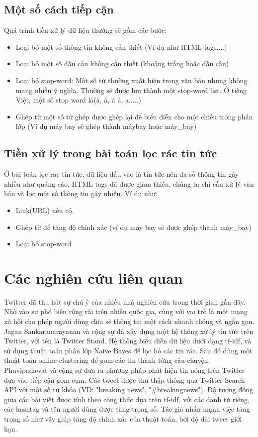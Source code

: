 \subsection{Một số cách tiếp cận}
Quá trình tiền xử lý dữ liệu thường sẽ gồm các bước:
\begin{itemize}
	\item Loại bỏ một số thông tin không cần thiết (Ví dụ như HTML tags,...)
	\item Loại bỏ một số dấu câu không cần thiết (khoảng trắng hoặc dấu câu)
	\item Loại bỏ stop-word: Một số từ thường xuất hiện trong văn bản nhưng không mang nhiều ý nghĩa. Thường sẽ được lưu thành một stop-word list. Ở tiếng Việt, một số stop word là(à, á, á à, ạ,....)
	\item Ghép từ một số từ ghép được ghép lại để biểu diễn cho một chiều trong phân lớp (Ví dụ máy bay sẽ ghép thành máybay hoặc máy\_bay)
\end{itemize}
\subsection{Tiền xử lý trong bài toán lọc rác tin tức}
Ở bài toán lọc rác tin tức, dữ liệu đầu vào là tin tức nên đa số thông tin gây nhiễu như quảng cáo, HTML tags đã được giảm thiểu, chúng ta chỉ cần xử lý văn bản và lọc một số thông tin gây nhiễu. Ví dụ như:
\begin{itemize}
	\item Link(URL) nếu có.
	\item Ghép từ để tăng độ chính xác (ví dụ máy bay sẽ được ghép thành máy\_bay)
	\item Loại bỏ stop-word
\end{itemize} 
\section{Các nghiên cứu liên quan}
Twitter đã thu hút sự chú ý của nhiều nhà nghiên cứu trong thời gian gần đây. Nhờ vào sự phổ biến rộng rãi trên nhiều quốc gia, cùng với vai trò là một mạng xã hội cho phép người dùng chia sẻ thông tin một cách nhanh chóng và ngắn gọn.
Jagan Sankaranarayanan và cộng sự \cite{TwiterStand:Sankaranarayanan} đã xây dựng một hệ thống xử lý tin tức trên Twitter, với tên là Twitter Stand. Hệ thống biểu diễn dữ liệu dưới dạng tf-idf, và sử dụng thuật toán phân lớp Naive Bayes để lọc bỏ các tin rác. Sau đó dùng một thuật toán online clustering để gom các tin thành từng câu chuyện.
Phuvipadawat và cộng sự \cite{SwitPhuvipadawat} đưa ra phương pháp phát hiện tin nóng trên Twitter dựa vào tiếp cận gom cụm. Các tweet được thu thập thông qua Twitter Search API với một số từ khóa (VD: "breaking news", "\#breakingnews"). Độ tương đồng giữa các bài viết được tính theo công thức dựa trên tf-idf, với các danh từ riêng, các hashtag và tên người dùng được tăng trọng số. Tác giả nhấn mạnh việc tăng trọng số như vậy giúp tăng độ chính xác của thuật toán, bởi độ dài tweet giới hạn.
